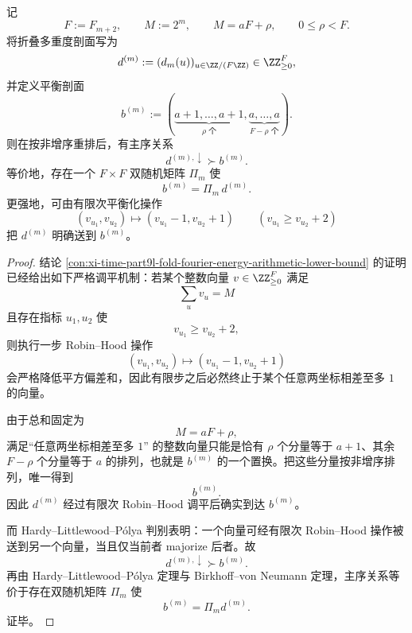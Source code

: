 \begin{theorem}\label{thm:xi-time-part64ba-fold-multiplicity-majorization-balancing}
记
\[
F:=F_{m+2},
\qquad
M:=2^m,
\qquad
M=aF+\rho,
\qquad
0\le \rho<F.
\]
将折叠多重度剖面写为
\[
d^{(m)}:=(d_m(u))_{u\in \ZZ/(F\ZZ)}\in \ZZ_{\ge 0}^{F},
\]
并定义平衡剖面
\[
b^{(m)}:=
(\underbrace{a+1,\dots,a+1}_{\rho\text{ 个}},
\underbrace{a,\dots,a}_{F-\rho\text{ 个}}).
\]
则在按非增序重排后，有主序关系
\[
\boxed{\;
d^{(m),\downarrow}\succ b^{(m)}.\;}
\]
等价地，存在一个 \(F\times F\) 双随机矩阵 \(\Pi_m\) 使
\[
\boxed{\;
b^{(m)}=\Pi_m\,d^{(m)}.\;}
\]
更强地，可由有限次平衡化操作
\[
(v_{u_1},v_{u_2})\longmapsto (v_{u_1}-1,v_{u_2}+1)
\qquad (v_{u_1}\ge v_{u_2}+2)
\]
把 \(d^{(m)}\) 明确送到 \(b^{(m)}\)。
\end{theorem}
\begin{proof}
结论 \ref{con:xi-time-part9l-fold-fourier-energy-arithmetic-lower-bound} 的证明已经给出如下严格调平机制：若某个整数向量 \(v\in\ZZ_{\ge 0}^{F}\) 满足
\[
\sum_u v_u=M
\]
且存在指标 \(u_1,u_2\) 使
\[
v_{u_1}\ge v_{u_2}+2,
\]
则执行一步 Robin--Hood 操作
\[
(v_{u_1},v_{u_2})\mapsto (v_{u_1}-1,v_{u_2}+1)
\]
会严格降低平方偏差和，因此有限步之后必然终止于某个任意两坐标相差至多 \(1\) 的向量。

由于总和固定为
\[
M=aF+\rho,
\]
满足“任意两坐标相差至多 \(1\)” 的整数向量只能是恰有 \(\rho\) 个分量等于 \(a+1\)、其余 \(F-\rho\) 个分量等于 \(a\) 的排列，也就是 \(b^{(m)}\) 的一个置换。把这些分量按非增序排列，唯一得到
\[
b^{(m)}.
\]
因此 \(d^{(m)}\) 经过有限次 Robin--Hood 调平后确实到达 \(b^{(m)}\)。

而 Hardy--Littlewood--Pólya 判别表明：一个向量可经有限次 Robin--Hood 操作被送到另一个向量，当且仅当前者 majorize 后者。故
\[
d^{(m),\downarrow}\succ b^{(m)}.
\]
再由 Hardy--Littlewood--Pólya 定理与 Birkhoff--von Neumann 定理，主序关系等价于存在双随机矩阵 \(\Pi_m\) 使
\[
b^{(m)}=\Pi_m d^{(m)}.
\]
证毕。
\end{proof}

